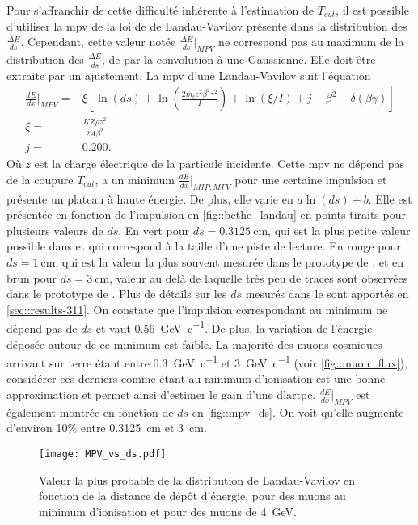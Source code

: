         Pour s'affranchir de cette difficulté inhérente à l'estimation de $T_{cut}$, il est possible d'utiliser la \gls{mpv} de la loi de de Landau-Vavilov présente dans la distribution des $\frac{\Delta E}{ds}$. Cependant, cette valeur notée $\frac{\Delta E}{ds}\rvert_{MPV}$ ne correspond pas au maximum de la distribution des $\frac{\Delta E}{ds}$, de par la convolution à une Gaussienne. Elle doit être extraite par un ajustement. La \gls{mpv} d'une Landau-Vavilov suit l'équation\cite{pdg2018}
        \begin{eqnarray}
          \frac{dE}{dx}\biggr\rvert_{MPV} = & \xi\left[\ln(ds) + \ln\left(\frac{2m_ec^2\beta^2\gamma^2}{I}\right)+\ln(\xi/I)+j-\beta^2 - \delta(\beta\gamma)\right] \label{eq::mpv} \\
          \xi = & \frac{KZ\rho z^2}{2A\beta^2}\nonumber\\
          j = & 0.200.\nonumber
        \end{eqnarray}
        Où $z$ est la charge électrique de la particule incidente. Cette \gls{mpv} ne dépend pas de la coupure $T_{cut}$, a un minimum $\frac{dE}{dx}\biggr\rvert_{MIP,MPV}$ pour une certaine impulsion et présente un plateau à haute énergie. De plus, elle varie en $a\ln(ds)+b$. Elle est présentée en fonction de l'impulsion en \autoref{fig::bethe_landau} en points-tiraits pour plusieurs valeurs de $ds$. En vert pour $ds=\SI{0.3125}{\centi\meter}$, qui est la plus petite valeur possible dans \protodp{} et qui correspond à la taille d'une piste de lecture. En rouge pour $ds=\SI{1}{\centi\meter}$, qui est la valeur la plus souvent mesurée dans le prototype de \TOO{}, et en brun pour $ds=\SI{3}{\centi\meter}$, valeur au delà de laquelle très peu de traces sont observées dans le prototype de \TOO{}. Plus de détails sur les $ds$ mesurés dans le \TOO{} sont apportés en \autoref{sec::results-311}. On constate que l'impulsion correspondant au minimum ne dépend pas de $ds$ et vaut \SI{0.56}{\giga\eV\per c}. De plus, la variation de l'énergie déposée autour de ce minimum est faible. La majorité des muons cosmiques arrivant sur terre étant entre \SI{0.3}{\giga\eV\per c} et \SI{3}{\giga\eV\per c} (voir \autoref{fig::muon_flux}), considérer ces derniers comme étant au minimum d'ionisation est une bonne approximation et permet ainsi d'estimer le gain d'une \gls{dlartpc}. $\frac{dE}{dx}\rvert_{MPV}$ est également montrée en fonction de $ds$ en \autoref{fig::mpv_ds}. On voit qu'elle augmente d'environ 10\;\% entre \SI{0.3125}{\centi\meter} et \SI{3}{\centi\meter}.

        \begin{figure}[!htb]
          \centering
          \texttt{[image: MPV\_vs\_ds.pdf]}
          \caption[Valeur la plus probable de la distribution de Landau-Vavilov en fonction de la distance de dépôt d'énergie]{\label{fig::mpv_ds}Valeur la plus probable de la distribution de Landau-Vavilov en fonction de la distance de dépôt d'énergie, pour des muons au minimum d'ionisation et pour des muons de \SI{4}{\giga\electronvolt}.}
        \end{figure}

